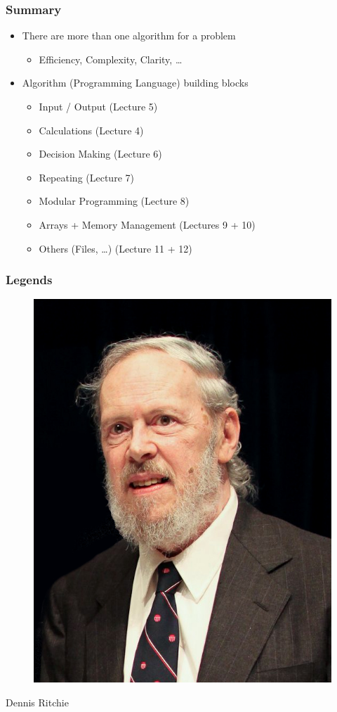 \documentclass{../c-lecture}
\begin{document}
\begin{frame}
  \frametitle{Summary}
  \begin{itemize}
    \item There are more than one algorithm for a problem
    \begin{itemize}
      \item Efficiency, Complexity, Clarity, \ldots
    \end{itemize}
    \item Algorithm (Programming Language) building blocks
    \begin{itemize}
      \item Input / Output (Lecture 5)
      \item Calculations (Lecture 4)
      \item Decision Making (Lecture 6)
      \item Repeating (Lecture 7)
      \item Modular Programming (Lecture 8)
      \item Arrays + Memory Management (Lectures 9 + 10)
      \item Others (Files, …) (Lecture 11 + 12)
    \end{itemize}
  \end{itemize}
\end{frame}

\begin{frame}
  \frametitle{Legends}
  \begin{figure}
    \includegraphics[height=.75\textheight]{./img/dennis.jpg}
  \end{figure}
  \pause%
  \centering
  \color{Violet} Dennis Ritchie
\end{frame}
\end{document}
